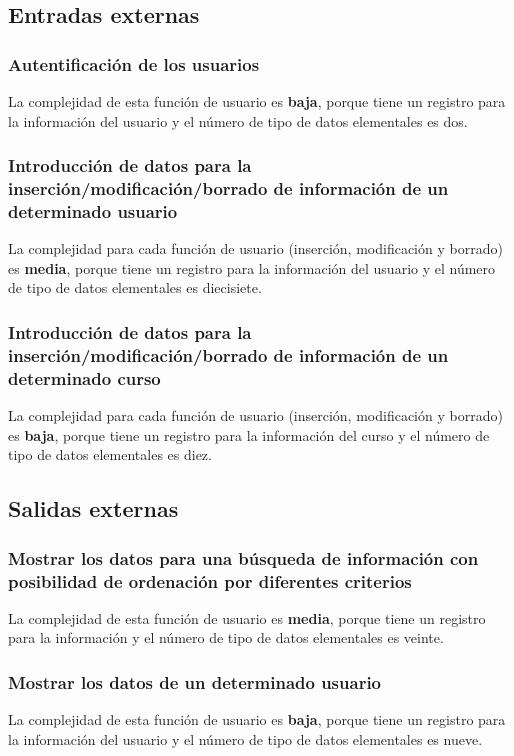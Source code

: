\documentclass[11pt,a4paper,spanish,twoside]{book}
\begin{document}
\subsection{Entradas externas}
\subsubsection{Autentificación de los usuarios}
La complejidad de esta función de usuario es \textbf{baja}, porque tiene un
registro para la información del usuario y el número de tipo de datos
elementales es dos. 

\subsubsection{Introducción de datos para la inserción/modificación/borrado 
  de información de un determinado usuario}
La complejidad para cada función de usuario (inserción, modificación y
borrado) es \textbf{media}, porque tiene un registro para la información del
usuario y el número de tipo de datos elementales es diecisiete.

\subsubsection{Introducción de datos para la inserción/modificación/borrado 
  de información de un determinado curso }
La complejidad para cada función de usuario (inserción, modificación y
borrado) es \textbf{baja}, porque tiene un registro para la información del
curso y el número de tipo de datos elementales es diez.

\subsection{Salidas externas}
\subsubsection{Mostrar los datos para una búsqueda de información con
  posibilidad de ordenación por diferentes criterios}
La complejidad de esta función de usuario es \textbf{media}, porque tiene un
registro para la información y el número de tipo de datos elementales es veinte.

\subsubsection{Mostrar los datos de un determinado usuario}
La complejidad de esta función de usuario es \textbf{baja}, porque tiene un
registro para la información del usuario y el número de tipo de datos
elementales es nueve.
\end{document}

